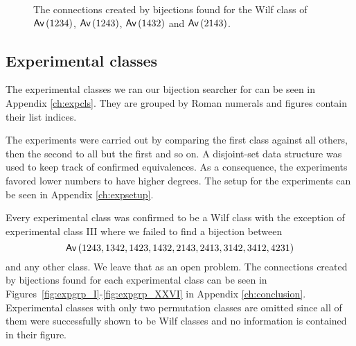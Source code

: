 \begin{figure}[ht!]
    \centering
    
    \caption{The connections created by bijections found for the Wilf class of $\textsf{Av}\left(1234\right)$, $\textsf{Av}\left(1243\right)$, $\textsf{Av}\left(1432\right)$ and $\textsf{Av}\left(2143\right)$.}
    \label{fig:1x4bi}
\end{figure}

\subsection{Experimental classes}
The experimental classes we ran our bijection searcher for can be seen in Appendix \ref{ch:expcls}. They are grouped by Roman numerals and figures contain their list indices.

The experiments were carried out by comparing the first class against all others, then the second to all but the first and so on. A disjoint-set data structure was used to keep track of confirmed equivalences. As a consequence, the experiments favored lower numbers to have higher degrees. The setup for the experiments can be seen in Appendix \ref{ch:expsetup}.

Every experimental class was confirmed to be a Wilf class with the exception of experimental class III where we failed to find a bijection between
\[
    \textsf{Av}\left(1243,1342,1423,1432,2143,2413,3142,3412,4231\right)
\]
and any other class. We leave that as an open problem. The connections created by bijections found for each experimental class can be seen in Figures~\ref{fig:expgrp_I}-\ref{fig:expgrp_XXVI} in Appendix \ref{ch:conclusion}. Experimental classes with only two permutation classes are omitted since all of them were successfully shown to be Wilf classes and no information is contained in their figure.

